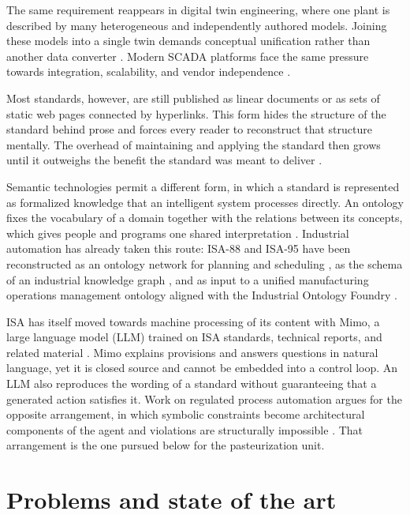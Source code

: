 The same requirement reappears in digital twin engineering, where one plant is
described by many heterogeneous and independently authored models. Joining these
models into a single twin demands conceptual unification rather than another
data converter \cite{DigitalTwins}. Modern SCADA platforms face the same
pressure towards integration, scalability, and vendor independence
\cite{Mladen2022}.

Most standards, however, are still published as linear documents or as sets of
static web pages connected by hyperlinks. This form hides the structure of the
standard behind prose and forces every reader to reconstruct that structure
mentally. The overhead of maintaining and applying the standard then grows until
it outweighs the benefit the standard was meant to deliver \cite{Serenkov-2004}.

Semantic technologies permit a different form, in which a standard is
represented as formalized knowledge that an intelligent system processes
directly. An ontology fixes the vocabulary of a domain together with the
relations between its concepts, which gives people and programs one shared
interpretation \cite{Golenkov2019}. Industrial automation has already taken this
route: ISA-88 and ISA-95 have been reconstructed as an ontology network for
planning and scheduling \cite{Vegetti2022}, as the schema of an industrial
knowledge graph \cite{Listl2023}, and as input to a unified manufacturing
operations management ontology aligned with the Industrial Ontology Foundry
\cite{Sarkar2026}.

ISA has itself moved towards machine processing of its content with Mimo, a
large language model (LLM) trained on ISA standards, technical reports, and
related material \cite{Mimo2024}. Mimo explains provisions and answers questions
in natural language, yet it is closed source and cannot be embedded into a
control loop. An LLM also reproduces the wording of a standard without
guaranteeing that a generated action satisfies it. Work on regulated process
automation argues for the opposite arrangement, in which symbolic constraints
become architectural components of the agent and violations are structurally
impossible \cite{Rombach2026}. That arrangement is the one pursued below for the
pasteurization unit.

\section{Problems and state of the art}


